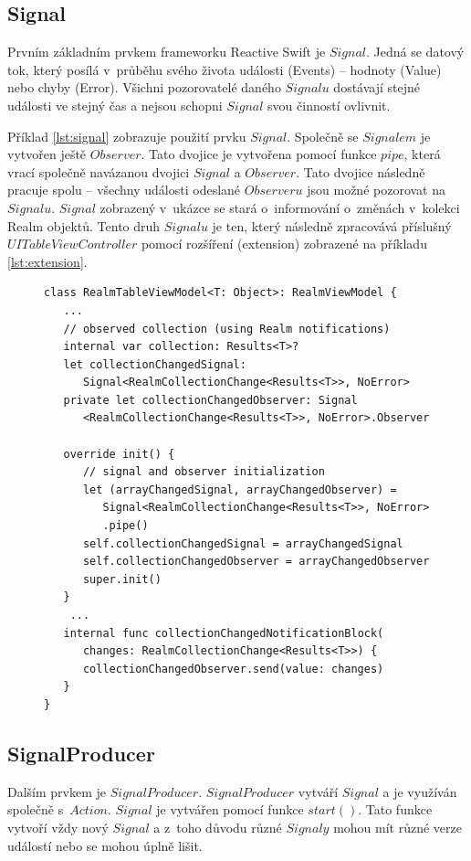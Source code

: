 \documentclass[thesis=M,czech]{FITthesis}[2012/06/26]
\begin{document}
\subsection{Signal}
Prvním základním prvkem frameworku Reactive Swift je $Signal$. Jedná se datový tok, který posílá v~průběhu svého života události (Events) -- hodnoty (Value) nebo chyby (Error). Všichni pozorovatelé daného $Signalu$ dostávají stejné události ve stejný čas a nejsou schopni $Signal$ svou činností ovlivnit. \cite{signal}

Příklad \ref{lst:signal} zobrazuje použití prvku $Signal$. Společně se $Signalem$ je vytvořen ještě $Observer$. Tato dvojice je vytvořena pomocí funkce $pipe$, která vrací společně navázanou dvojici $Signal$ a $Observer$. Tato dvojice následně pracuje spolu -- všechny události odeslané $Observeru$ jsou možné pozorovat na $Signalu$. $Signal$ zobrazený v~ukázce se stará o~informování o~změnách v~kolekci Realm objektů. Tento druh $Signalu$ je ten, který následně zpracovává příslušný $UITableViewController$ pomocí rozšíření (extension) zobrazené na příkladu \ref{lst:extension}.

\begin{figure}
\begin{minipage}{\linewidth}
\begin{lstlisting}[caption={Ukázka použití prvku Signal},label={lst:signal}]
class RealmTableViewModel<T: Object>: RealmViewModel {
   ...
   // observed collection (using Realm notifications)
   internal var collection: Results<T>?
   let collectionChangedSignal: 
      Signal<RealmCollectionChange<Results<T>>, NoError>
   private let collectionChangedObserver: Signal
      <RealmCollectionChange<Results<T>>, NoError>.Observer

   override init() {
      // signal and observer initialization
      let (arrayChangedSignal, arrayChangedObserver) = 
         Signal<RealmCollectionChange<Results<T>>, NoError>
         .pipe()
      self.collectionChangedSignal = arrayChangedSignal
      self.collectionChangedObserver = arrayChangedObserver
      super.init()
   }
    ...
   internal func collectionChangedNotificationBlock(
      changes: RealmCollectionChange<Results<T>>) {
      collectionChangedObserver.send(value: changes)
   }
}
\end{lstlisting}
\end{minipage}
\end{figure}	

\subsection{SignalProducer}
Dalším prvkem je $SignalProducer$. $SignalProducer$ vytváří $Signal$ a je využíván společně s~$Action$. $Signal$ je vytvářen pomocí funkce $start()$. Tato funkce vytvoří vždy nový $Signal$ a z~toho důvodu různé $Signaly$ mohou mít různé verze událostí nebo se mohou úplně lišit. \cite{signalProducer}
\end{document}
